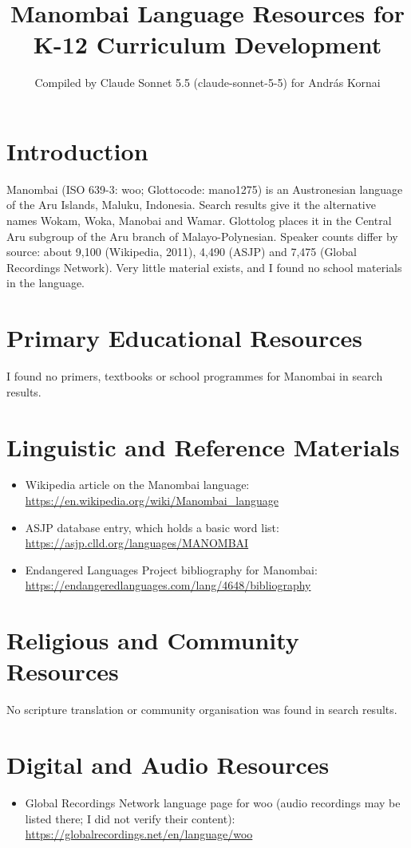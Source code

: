 \documentclass[12pt]{article}
\title{Manombai Language Resources for K-12 Curriculum Development}
\author{Compiled by Claude Sonnet 5.5 (claude-sonnet-5-5) for Andr\'as Kornai}
\date{}
\begin{document}
\maketitle

\section{Introduction}
Manombai (ISO 639-3: woo; Glottocode: mano1275) is an Austronesian language of the Aru Islands, Maluku, Indonesia. Search results give it the alternative names Wokam, Woka, Manobai and Wamar. Glottolog places it in the Central Aru subgroup of the Aru branch of Malayo-Polynesian. Speaker counts differ by source: about 9,100 (Wikipedia, 2011), 4,490 (ASJP) and 7,475 (Global Recordings Network). Very little material exists, and I found no school materials in the language.

\section{Primary Educational Resources}
I found no primers, textbooks or school programmes for Manombai in search results.

\section{Linguistic and Reference Materials}
\begin{itemize}
\item Wikipedia article on the Manombai language: \url{https://en.wikipedia.org/wiki/Manombai_language}
\item ASJP database entry, which holds a basic word list: \url{https://asjp.clld.org/languages/MANOMBAI}
\item Endangered Languages Project bibliography for Manombai: \url{https://endangeredlanguages.com/lang/4648/bibliography}
\end{itemize}

\section{Religious and Community Resources}
No scripture translation or community organisation was found in search results.

\section{Digital and Audio Resources}
\begin{itemize}
\item Global Recordings Network language page for woo (audio recordings may be listed there; I did not verify their content): \url{https://globalrecordings.net/en/language/woo}
\end{itemize}
\end{document}
